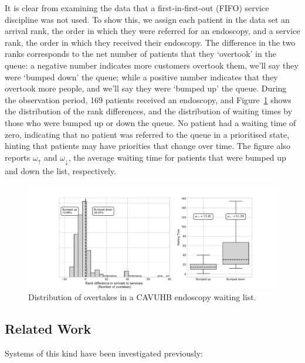 \documentclass{article}
\begin{document}
It is clear from examining the data that a first-in-first-out (FIFO) service
discipline was not used. To show this, we assign each patient in the data set
an arrival rank, the order in which they were referred for an endoscopy, and a
service rank, the order in which they received their endoscopy. The difference
in the two ranks corresponds to the net number of patients that they `overtook'
in the queue: a negative number indicates more customers overtook them, we'll
say they were `bumped down' the queue; while a positive number indicates that
they overtook more people, and we'll say they were `bumped up' the queue. During
the observation period, 169 patients received an endoscopy, and
Figure~\ref{fig:motivating_overtakes} shows the distribution of the rank
differences, and the distribution of waiting times by those who were bumped up
or down the queue. No patient had a waiting time of zero, indicating that no
patient was referred to the queue in a prioritised state, hinting that patients
may have priorities that change over time.
The figure also reports $\omega_{\uparrow}$ and $\omega_{\downarrow}$, the
average waiting time for patients that were bumped up and down the list,
respectively.

\begin{figure}
  \begin{center}
    \includegraphics[width=\textwidth]{img/motivating_overtakes.pdf}
  \end{center}
  \caption{Distribution of overtakes in a CAVUHB endoscopy waiting list.}
  \label{fig:motivating_overtakes}
\end{figure}

\subsection{Related Work}\label{sec:related}
Systems of this kind have been investigated previously:
\end{document}
